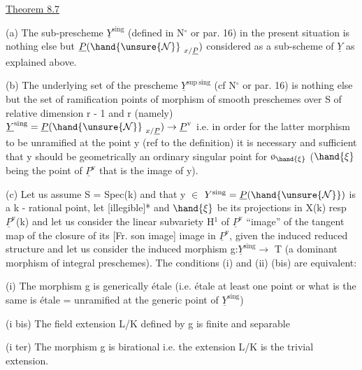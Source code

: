 
\uline{Theorem 8.7}

(a) The sub-prescheme $\underline{Y}^{\mathrm{sing}}$ (defined in N$^\circ$ or par. 16) in the
present situation is nothing else but $\underline{P}(\hand{\unsure{\mathcal{N}}}_{\ x/\underline{P}})$ considered as a
sub-scheme of $\underline{Y}$ as explained above.

(b) The underlying set of the prescheme $\underline{Y}^{\mathrm{sup\ sing}}$ (cf N$^\circ$ or
par. 16) is nothing else but the set of ramification points of
morphism of smooth preschemes over S of relative dimension r - 1
and r (namely) $\underline{Y}^{\mathrm{sing}} = \underline{P}(\hand{\unsure{\mathcal{N}}}_{\ x/\underline{P}}) \rightarrow \underline{P}^{\mathrm{v}}$ i.e. in order for the latter
morphism to be unramified at the point y (ref to the definition)
it is necessary and sufficient that y should be geometrically an
ordinary singular point for $\text{ø}_{\hand{\xi}}$ ($\hand{\xi}$ being the point of $\underline{P}^{\mathrm{v}}$ that is the
image of y).

(c) Let us assume S = Spec(k) and that y $\in$ $Y^{\mathrm{sing}} = \underline{P}(\hand{\unsure{\mathcal{N}}})$ is
a k - rational point, let [illegible]* and $\hand{\xi}$ be its projections in
X(k) resp $\underline{P}^{\mathrm{v}}$(k) and let us consider the linear subvariety H$^1$ of $\underline{P}^{\mathrm{v}}$
``image'' of the tangent map of the closure of its [Fr. son image]
image in $\underline{P}^{\mathrm{v}}$, given the induced reduced structure and let us
consider the induced morphism g:$\underline{Y}^{\mathrm{sing}} \rightarrow$ T (a dominant morphism of
integral preschemes). The conditions (i) and (ii) (bis) are
equivalent:

(i) The morphism g is generically étale (i.e. étale at least
one point or what is the same is étale = unramified at the generic
point of $\underline{Y}^{\mathrm{sing}}$)

(i bis) The field extension L/K defined by g is finite and
separable

(i ter) The morphism g is birational i.e. the extension L/K
is the trivial extension.


